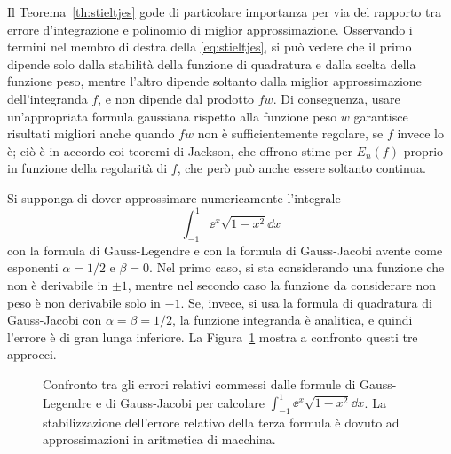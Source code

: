 	Il Teorema~\ref{th:stieltjes} gode di particolare importanza per via del rapporto tra errore d'integrazione e polinomio di miglior approssimazione. Osservando i termini nel membro di destra della \eqref{eq:stieltjes}, si può vedere che il primo dipende solo dalla stabilità della funzione di quadratura e dalla scelta della funzione peso, mentre l'altro dipende soltanto dalla miglior approssimazione dell'integranda \(f\), e non dipende dal prodotto \(f w\). Di conseguenza, usare un'appropriata formula gaussiana rispetto alla funzione peso \(w\) garantisce risultati migliori anche quando \(f w\) non è sufficientemente regolare, se \(f\) invece lo è; ciò è in accordo coi teoremi di Jackson, che offrono stime per \(E_n (f)\) proprio in funzione della regolarità di \(f\), che però può anche essere soltanto continua.
	
	\begin{esempio}
		Si supponga di dover approssimare numericamente l'integrale
		\begin{equation*}
			\int_{-1}^1 \ee^x \sqrt{1 - x^2} \dd{x}
		\end{equation*}
		con la formula di Gauss-Legendre e con la formula di Gauss-Jacobi avente come esponenti \(\alpha = 1 / 2\) e \(\beta = 0\). Nel primo caso, si sta considerando una funzione che non è derivabile in \(\pm 1\), mentre nel secondo caso la funzione da considerare non peso è non derivabile solo in \(-1\). Se, invece, si usa la formula di quadratura di Gauss-Jacobi con \(\alpha = \beta = 1/2\), la funzione integranda è analitica, e quindi l'errore è di gran lunga inferiore. La Figura~\ref{fig:legendre-jacobi} mostra a confronto questi tre approcci.
		
		\begin{figure}[tpb]
			\centering
			
			
			\caption{Confronto tra gli errori relativi commessi dalle formule di Gauss-Legendre e di Gauss-Jacobi per calcolare \(\int_{-1}^1 \ee^x \sqrt{1 - x^2} \dd{x}\). La stabilizzazione dell'errore relativo della terza formula è dovuto ad approssimazioni in aritmetica di macchina.}\label{fig:legendre-jacobi}
		\end{figure}
	\end{esempio}

